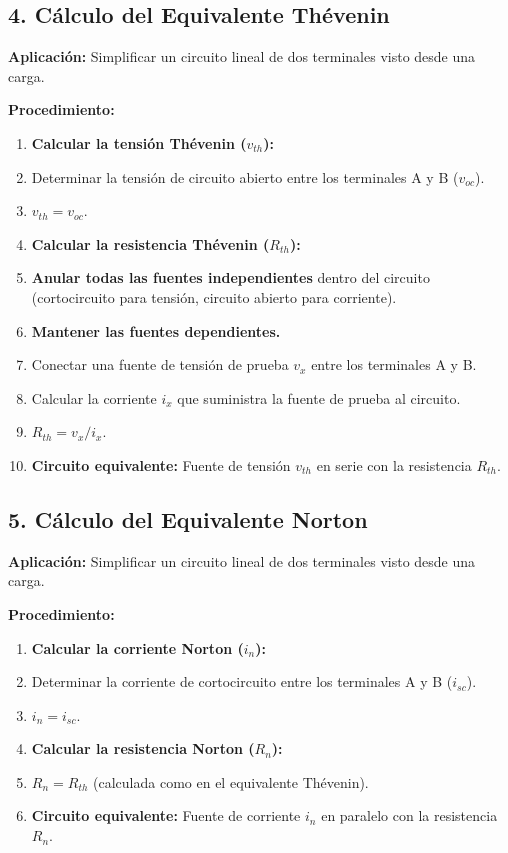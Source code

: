 \documentclass[11pt,a4paper]{article}
\begin{document}
\subsection*{4. Cálculo del Equivalente Thévenin}


\textbf{Aplicación:} Simplificar un circuito lineal de dos terminales visto desde una carga.


\textbf{Procedimiento:}


\begin{enumerate}[leftmargin=*,topsep=2pt,itemsep=1pt]
  \item \textbf{Calcular la tensión Thévenin ($v_{th}$):}
  \item Determinar la tensión de circuito abierto entre los terminales A y B ($v_{oc}$).
  \item $v_{th} = v_{oc}$.
  \item \textbf{Calcular la resistencia Thévenin ($R_{th}$):}
  \item \textbf{Anular todas las fuentes independientes} dentro del circuito (cortocircuito para tensión, circuito abierto para corriente).
  \item \textbf{Mantener las fuentes dependientes.}
  \item Conectar una fuente de tensión de prueba $v_x$ entre los terminales A y B.
  \item Calcular la corriente $i_x$ que suministra la fuente de prueba al circuito.
  \item $R_{th} = v_x / i_x$.
  \item \textbf{Circuito equivalente:} Fuente de tensión $v_{th}$ en serie con la resistencia $R_{th}$.
\end{enumerate}


\subsection*{5. Cálculo del Equivalente Norton}


\textbf{Aplicación:} Simplificar un circuito lineal de dos terminales visto desde una carga.


\textbf{Procedimiento:}


\begin{enumerate}[leftmargin=*,topsep=2pt,itemsep=1pt]
  \item \textbf{Calcular la corriente Norton ($i_n$):}
  \item Determinar la corriente de cortocircuito entre los terminales A y B ($i_{sc}$).
  \item $i_n = i_{sc}$.
  \item \textbf{Calcular la resistencia Norton ($R_n$):}
  \item $R_n = R_{th}$ (calculada como en el equivalente Thévenin).
  \item \textbf{Circuito equivalente:} Fuente de corriente $i_n$ en paralelo con la resistencia $R_n$.
\end{enumerate}
\end{document}
